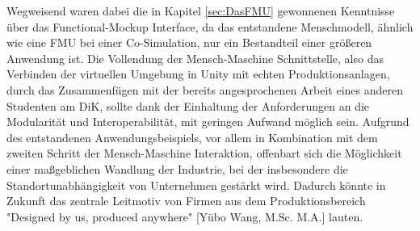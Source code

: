 \newline
Wegweisend waren dabei die in Kapitel \ref{sec:DasFMU} gewonnenen Kenntnisse über das Functional-Mockup Interface, da das entstandene Menschmodell, ähnlich wie eine FMU bei einer Co-Simulation, nur ein Bestandteil einer größeren Anwendung ist. Die Vollendung der Mensch-Maschine Schnittstelle, also das Verbinden der virtuellen Umgebung in Unity mit echten Produktionsanlagen, durch das Zusammenfügen mit der bereits angesprochenen Arbeit eines anderen Studenten am DiK, sollte dank der Einhaltung der Anforderungen an die Modularität und Interoperabilität, mit geringen Aufwand möglich sein.
\newline\newline
Aufgrund des entstandenen Anwendungsbeispiels, vor allem in Kombination mit dem zweiten Schritt der Mensch-Maschine Interaktion, offenbart sich die Möglichkeit einer maßgeblichen Wandlung der Industrie, bei der insbesondere die Standortunabhängigkeit von Unternehmen gestärkt wird. Dadurch könnte in Zukunft das zentrale Leitmotiv von Firmen aus dem Produktionsbereich "Designed by us, produced anywhere" [Yübo Wang, M.Sc. M.A.] lauten.
